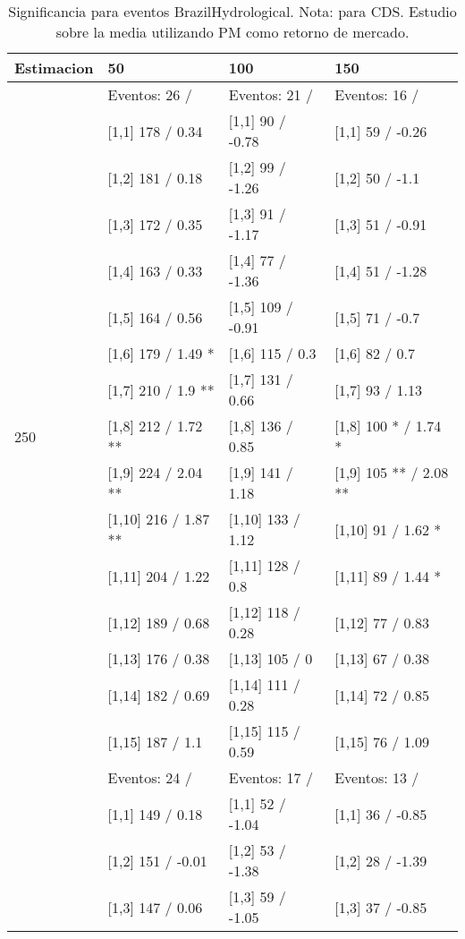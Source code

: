 \begin{table}

\caption{Significancia para eventos BrazilHydrological. Nota: para CDS. Estudio sobre la media utilizando PM como retorno de mercado.}
\centering
\begin{tabular}[t]{llll}
\toprule
Estimacion & 50 & 100 & 150\\
\midrule
 & Eventos:  26 / & Eventos:  21 / & Eventos:  16 /\\
 & {}[1,1] 178  / 0.34 & {}[1,1] 90  / -0.78 & {}[1,1] 59  / -0.26\\
 & {}[1,2] 181  / 0.18 & {}[1,2] 99  / -1.26 & {}[1,2] 50  / -1.1\\
 & {}[1,3] 172  / 0.35 & {}[1,3] 91  / -1.17 & {}[1,3] 51  / -0.91\\
 & {}[1,4] 163  / 0.33 & {}[1,4] 77  / -1.36 & {}[1,4] 51  / -1.28\\
\addlinespace
 & {}[1,5] 164  / 0.56 & {}[1,5] 109  / -0.91 & {}[1,5] 71  / -0.7\\
 & {}[1,6] 179  / 1.49 * & {}[1,6] 115  / 0.3 & {}[1,6] 82  / 0.7\\
 & {}[1,7] 210  / 1.9 ** & {}[1,7] 131  / 0.66 & {}[1,7] 93  / 1.13\\
250 & {}[1,8] 212  / 1.72 ** & {}[1,8] 136  / 0.85 & {}[1,8] 100 * / 1.74 *\\
 & {}[1,9] 224  / 2.04 ** & {}[1,9] 141  / 1.18 & {}[1,9] 105 ** / 2.08 **\\
\addlinespace
 & {}[1,10] 216  / 1.87 ** & {}[1,10] 133  / 1.12 & {}[1,10] 91  / 1.62 *\\
 & {}[1,11] 204  / 1.22 & {}[1,11] 128  / 0.8 & {}[1,11] 89  / 1.44 *\\
 & {}[1,12] 189  / 0.68 & {}[1,12] 118  / 0.28 & {}[1,12] 77  / 0.83\\
 & {}[1,13] 176  / 0.38 & {}[1,13] 105  / 0 & {}[1,13] 67  / 0.38\\
 & {}[1,14] 182  / 0.69 & {}[1,14] 111  / 0.28 & {}[1,14] 72  / 0.85\\
\addlinespace
 & {}[1,15] 187  / 1.1 & {}[1,15] 115  / 0.59 & {}[1,15] 76  / 1.09\\
 & Eventos:  24 / & Eventos:  17 / & Eventos:  13 /\\
 & {}[1,1] 149  / 0.18 & {}[1,1] 52  / -1.04 & {}[1,1] 36  / -0.85\\
 & {}[1,2] 151  / -0.01 & {}[1,2] 53  / -1.38 & {}[1,2] 28  / -1.39\\
 & {}[1,3] 147  / 0.06 & {}[1,3] 59  / -1.05 & {}[1,3] 37  / -0.85\\

\end{tabular}
\end{table}
